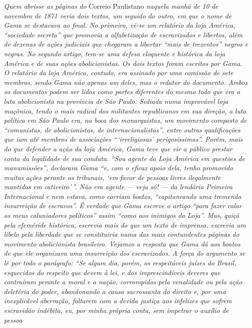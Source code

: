 \begin{argumento}
\emph{Quem abrisse as páginas do} Correio Paulistano \emph{naquela manhã
de 10 de novembro de 1871 veria dois textos, um seguido do outro, em que
o nome de Gama se destacava ao final. No primeiro, vê-se um relatório da
loja América, ``sociedade secreta'' que promovia a alfabetização de
escravizados e libertos, além de dezenas de ações judiciais que chegaram
a libertar ``mais de trezentos'' negros e negras. No segundo artigo,
tem-se uma defesa eloquente e histórica da loja América e de suas ações
abolicionistas. Os dois textos foram escritos por Gama. O relatório da
loja América, contudo, era assinado por uma comissão de sete membros,
sendo Gama não apenas um deles, mas o redator do documento. Ambos os
documentos podem ser lidos como partes diferentes do mesmo todo que era
a luta abolicionista na província de São Paulo. Sediada numa improvável
loja maçônica, tendo o mais radical dos militantes republicanos em sua
direção, a luta política em São Paulo era, na boca dos monarquistas, um
movimento composto de ``comunistas, de abolicionistas, de
internacionalistas'', entre outras qualificações que iam até membros de
associações ```irreligiosas' perigosíssimas''. Porém, mais do que defender
a ação da loja América, Gama teve que vir a público prestar conta da
legalidade de sua conduta. ``Sou agente da Loja América em questões de
manumissões'', declarava Gama ``e, com o eficaz apoio dela, tenho
promovido muitas ações perante os tribunais, `em favor de pessoas livres
ilegalmente mantidas em cativeiro'\,''. Não era agente --- veja só! --- da
lendária Primeira Internacional e nem estava, como corriam boatos,
``capitaneando uma tremenda insurreição de escravos''. É verdade que Gama
escreve o artigo ``para fazer calar os meus caluniadores políticos'' assim
``como aos inimigos da Loja''. Mas, quiçá pela efeméride histórica,
escrevia mais do que um texto de imprensa, escrevia um libelo pela
liberdade que se constituiria numa das mais contundentes páginas do
movimento abolicionista brasileiro. Vejamos a resposta que Gama dá aos
boatos de que ele organizava uma insurreição dos escravizados. A força
do argumento se lê por todo o parágrafo: ``Se algum dia, porém, os
respeitáveis juízes do Brasil, esquecidos do respeito que devem à lei, e
dos imprescindíveis deveres que contraíram perante a moral e a nação,
corrompidos pela venalidade ou pela ação deletéria do poder, abandonando
a causa sacrossanta do direito e, por uma inexplicável aberração,
faltarem com a devida justiça aos infelizes que sofrem escravidão
indébita, eu, por minha própria conta, sem impetrar o auxílio de pessoa
}
\end{argumento}
